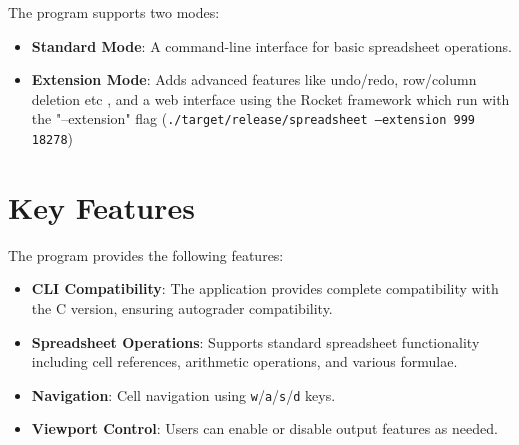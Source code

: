 \documentclass[12pt]{article}
\begin{document}
The program supports two modes:
\begin{itemize}
    \item \textbf{Standard Mode}: A command-line interface for basic spreadsheet operations.
    \item \textbf{Extension Mode}: Adds advanced features like undo/redo, row/column deletion etc , and a web interface using the Rocket framework which run with the "--extension" flag (\texttt{./target/release/spreadsheet --extension 999 18278})
\end{itemize}


\section{Key Features}
The program provides the following features:
\begin{itemize}
\subsection{Core Features}

    \item \textbf{CLI Compatibility}: The application provides complete compatibility with the C version, ensuring autograder compatibility.
    \item \textbf{Spreadsheet Operations}: Supports standard spreadsheet functionality including cell references, arithmetic operations, and various formulae.
    \item \textbf{Navigation}: Cell navigation using \texttt{w}/\texttt{a}/\texttt{s}/\texttt{d} keys.
    \item \textbf{Viewport Control}: Users can enable or disable output features as needed.
\end{itemize}
\end{document}
